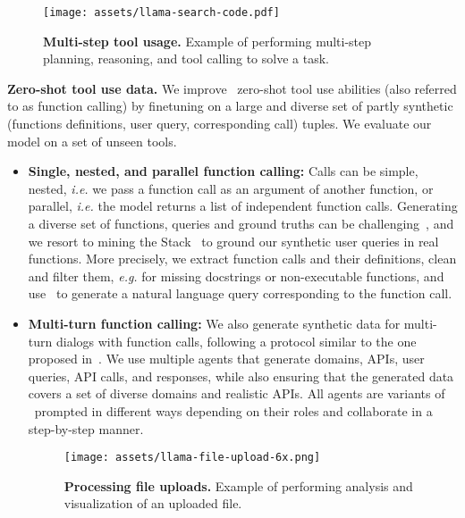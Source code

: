 \begin{figure}[t]
    \centering
    \texttt{[image: assets/llama-search-code.pdf]}
    \caption{\textbf{Multi-step tool usage.} Example of \llamathree performing multi-step planning, reasoning, and tool calling to solve a task.}
    \label{fig:multi_step_tool_use}
\end{figure}

\textbf{Zero-shot tool use data.}
We improve \llamathree~zero-shot tool use abilities (also referred to as function calling) by finetuning on a large and diverse set of partly synthetic (functions definitions, user query, corresponding call) tuples. We evaluate our model on a set of unseen tools. 
\begin{itemize}
    \item \textbf{Single, nested, and parallel function calling:} %
    Calls can be simple, nested, \textit{i.e.} we pass a function call as an argument of another function, or parallel, \textit{i.e.} the model returns a list of independent function calls. Generating a diverse set of functions, queries and ground truths can be challenging~\citep{mekala2024toolverifier}, and we resort to mining the Stack~\citep{kocetkov2022stack3tbpermissively} to ground our synthetic user queries in real functions. More precisely, we extract function calls and their definitions, clean and filter them, \textit{e.g.} for missing docstrings or non-executable functions, and use \llamathree~to generate a natural language query corresponding to the function call. 

    \item \textbf{Multi-turn function calling:}  We also generate synthetic data for multi-turn dialogs with function calls, following a protocol similar to the one proposed in~\cite{li2023api}. We use multiple agents that generate domains, APIs, user queries, API calls, and responses, while also ensuring that the generated data covers a set of diverse domains and realistic APIs. All agents are variants of \llamathree~prompted in different ways depending on their roles and collaborate in a step-by-step manner. %
    

\begin{figure}[t]
    \centering
    \texttt{[image: assets/llama-file-upload-6x.png]}
    \caption{\textbf{Processing file uploads.} Example of \llamathree performing analysis and visualization of an uploaded file.}
    \label{fig:file_upload}
\end{figure}

\end{itemize}


